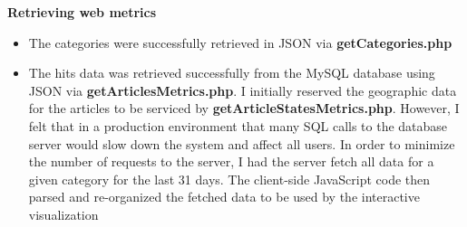 \documentclass[12pt]{article}
\begin{document}
{\newpage

\noindent\textbf{Retrieving web metrics} 
\begin{itemize}
\item The categories were successfully retrieved in JSON via \textbf{getCategories.php}
\item The hits data was retrieved successfully from the MySQL database using JSON via \textbf{getArticlesMetrics.php}. I initially reserved the geographic data for the articles to be serviced by \textbf{getArticleStatesMetrics.php}. However, I felt that in a production environment that many SQL calls to the database server would slow down the system and affect all users. In order to minimize the number of requests to the server, I had the server fetch all data for a given category for the last 31 days. The client-side JavaScript code then parsed and re-organized the fetched data to be used by the interactive visualization
\end{itemize}

\vspace{0.2in}

}
\end{document}

